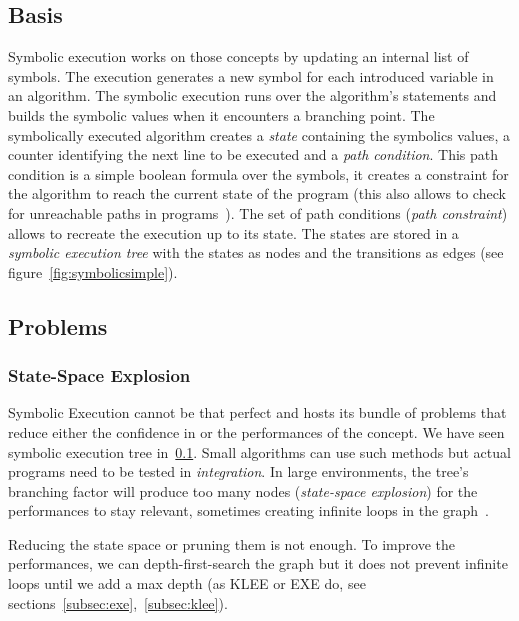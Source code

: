 \documentclass[11pt, conference]{IEEEtran}
\begin{document}
    \subsection{Basis}
      \label{sub:basis}
      Symbolic execution works on those concepts by updating an internal list of symbols. The execution generates a new symbol for each introduced variable in an algorithm\cite{newapproach}. The symbolic execution runs over the algorithm's statements and builds the symbolic values when it encounters a branching point. The symbolically executed algorithm creates a \emph{state}\cite{visserWillemCorina} containing the symbolics values, a counter identifying the next line to be executed and a \emph{path condition}. This path condition is a simple boolean formula over the symbols, it creates a constraint for the algorithm to reach the current state of the program (this also allows to check for unreachable paths in programs~\cite{InfeasiblePathsEliminationWithSymbolicExecTechniques}). The set of path conditions (\emph{path constraint}) allows to recreate the execution up to its state. The states are stored in a \emph{symbolic execution tree} with the states as nodes and the transitions as edges (see figure~\ref{fig:symbolicsimple}).

    \subsection{Problems}
      \label{sec:problems}
      \subsubsection{State-Space Explosion}
        \label{subsec:state-space-explosion}
        Symbolic Execution cannot be that perfect and hosts its bundle of problems that reduce either the confidence in or the performances of the concept. We have seen symbolic execution tree in~\ref{sub:basis}. Small algorithms can use such methods but actual programs need to be tested in \emph{integration}. In large environments, the tree's branching factor will produce too many nodes (\emph{state-space explosion}) for the performances to stay relevant, sometimes creating infinite loops in the graph~\cite{forwardSymbolicExecution}.

        Reducing the state space or pruning them is not enough. To improve the performances, we can depth-first-search the graph but it does not prevent infinite loops until we add a max depth (as KLEE or EXE do, see sections~\ref{subsec:exe},~\ref{subsec:klee}).
\end{document}
